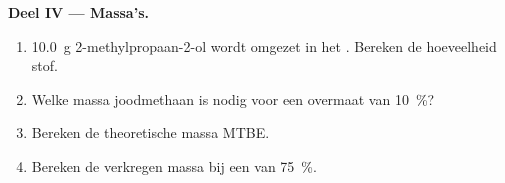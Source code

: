 \begin{problem}
\medskip
\noindent\textbf{Deel IV --- Massa's.}
\begin{enumerate}[resume]
  \item \qty{10.0}{g} 2-methylpropaan-2-ol wordt omgezet in het .
        Bereken de hoeveelheid stof.
  \item Welke massa joodmethaan is nodig voor een overmaat van
        \qty{10}{\percent}?
  \item Bereken de theoretische massa MTBE.
  \item Bereken de verkregen massa bij een  van
        \qty{75}{\percent}.
\end{enumerate}
\end{problem}
